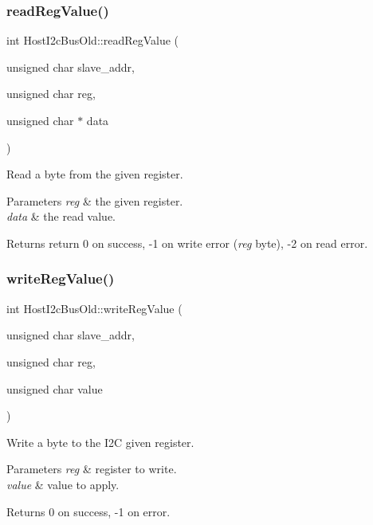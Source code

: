\subsubsection{\texorpdfstring{read\+Reg\+Value()}{readRegValue()}}
{\footnotesize\ttfamily int Host\+I2c\+Bus\+Old\+::read\+Reg\+Value (\begin{DoxyParamCaption}\item[{unsigned char}]{slave\+\_\+addr,  }\item[{unsigned char}]{reg,  }\item[{unsigned char $\ast$}]{data }\end{DoxyParamCaption})}



Read a byte from the given register. 


\begin{DoxyParams}{Parameters}
{\em reg} & the given register. \\
\hline
{\em data} & the read value.\\
\hline
\end{DoxyParams}
\begin{DoxyReturn}{Returns}
return 0 on success, -\/1 on write error ({\itshape reg} byte), -\/2 on read error. 
\end{DoxyReturn}
\mbox{\label{classHostI2cBusOld_a85fb525b83ff1c773a4cde7c39ac1a0e}} 
\subsubsection{\texorpdfstring{write\+Reg\+Value()}{writeRegValue()}}
{\footnotesize\ttfamily int Host\+I2c\+Bus\+Old\+::write\+Reg\+Value (\begin{DoxyParamCaption}\item[{unsigned char}]{slave\+\_\+addr,  }\item[{unsigned char}]{reg,  }\item[{unsigned char}]{value }\end{DoxyParamCaption})}



Write a byte to the I2C given register. 


\begin{DoxyParams}{Parameters}
{\em reg} & register to write. \\
\hline
{\em value} & value to apply.\\
\hline
\end{DoxyParams}
\begin{DoxyReturn}{Returns}
0 on success, -\/1 on error. 
\end{DoxyReturn}


